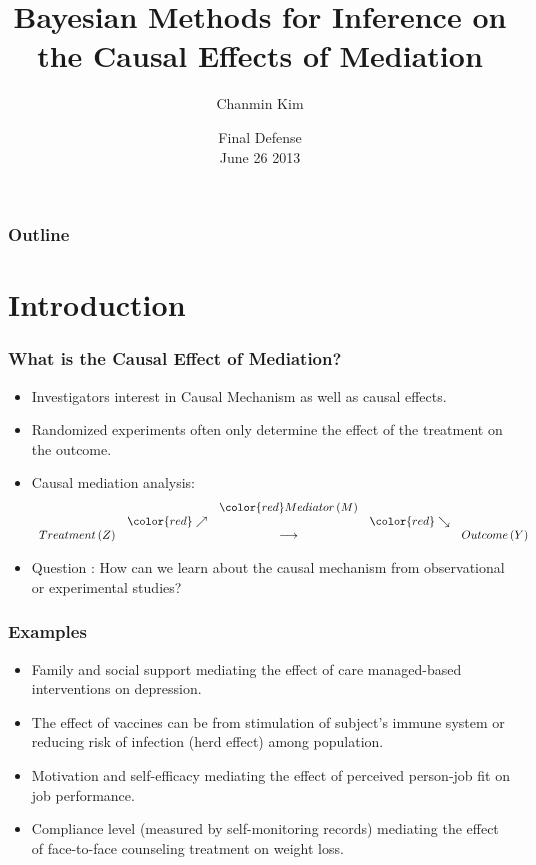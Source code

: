 \documentclass{beamer}
\title{Bayesian Methods for Inference on the Causal Effects of Mediation}
\author[]{Chanmin Kim}
\date{Final Defense \\ June 26 2013}
\institute{Department of Statistics \\ Univsesity of Florida}
\begin{document}
\begin{frame}
 \titlepage
\end{frame}
\begin{frame}
 \frametitle{Outline}\section{}

\tableofcontents[currentsubsection]

\end{frame}

\section{Introduction}
\begin{frame}
\frametitle{What is the Causal Effect of Mediation?}
\begin{itemize}
\item Investigators interest in {\color{red} Causal Mechanism} as well as causal effects.
\item Randomized experiments often only determine the effect of the
  treatment on the outcome.
\item Causal mediation analysis:
\begin{equation*}
\begin{array}{ccccc}
  &          & \color{red} Mediator\, (M) & &\\
  & \color{red} \nearrow & & \color{red}\searrow & \\
Treatment\, (Z) & & \longrightarrow & & Outcome\, (Y) 
\end{array}
\end{equation*}
\item Question : How can we learn about the causal mechanism from
  observational or experimental studies?
\end{itemize}
\end{frame}

\begin{frame}
\frametitle{Examples}
\begin{itemize}
\item Family and social support mediating the effect of care
  managed-based interventions on depression.
\item The effect of vaccines can be from stimulation of subject's
  immune system or reducing risk of infection (herd effect) among
  population.
\item Motivation and self-efficacy mediating the effect of perceived
  person-job fit on job performance. 
\item Compliance level (measured by self-monitoring records) mediating
  the effect of face-to-face counseling treatment on weight loss. 
\end{itemize}
\end{frame}
\end{document}
